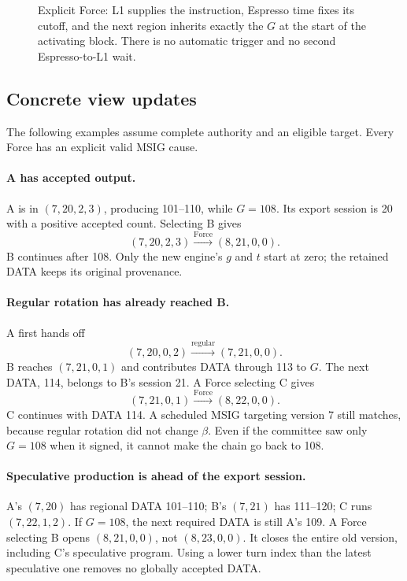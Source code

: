 \documentclass[11pt,a4paper]{article}
\begin{document}
\begin{figure}[p]\centering

\caption{Explicit Force: L1 supplies the instruction, Espresso time fixes
its cutoff, and the next region inherits exactly the $G$ at the start of
the activating block. There is no automatic trigger and no second
Espresso-to-L1 wait.}
\label{fig:forced-cross-region}
\end{figure}
\FloatBarrier

\subsection{Concrete view updates}
\label{sec:force-view-examples}
The following examples assume complete authority and an eligible target.
Every Force has an explicit valid MSIG cause.

\paragraph{A has accepted output.}
A is in $(7,20,2,3)$, producing 101--110, while $G=108$. Its export
session is 20 with a positive accepted count. Selecting B gives
\[
 (7,20,2,3)\xrightarrow{\mathrm{Force}}(8,21,0,0).
\]
B continues after 108. Only the new engine's $g$ and $t$ start at zero;
the retained DATA keeps its original provenance.

\paragraph{Regular rotation has already reached B.}
A first hands off
\[
 (7,20,0,2)\xrightarrow{\mathrm{regular}}(7,21,0,0).
\]
B reaches $(7,21,0,1)$ and contributes DATA through 113 to $G$. The next
DATA, 114, belongs to B's session 21. A Force selecting C gives
\[
 (7,21,0,1)\xrightarrow{\mathrm{Force}}(8,22,0,0).
\]
C continues with DATA 114. A scheduled MSIG targeting version 7 still
matches, because regular rotation did not change $\beta$. Even if the
committee saw only $G=108$ when it signed, it cannot make the chain go
back to 108.

\paragraph{Speculative production is ahead of the export session.}
A's $(7,20)$ has regional DATA 101--110; B's $(7,21)$ has 111--120; C runs
$(7,22,1,2)$. If $G=108$, the next required DATA is still A's 109. A Force
selecting B opens $(8,21,0,0)$, not $(8,23,0,0)$. It closes the entire old
version, including C's speculative program. Using a lower turn index than
the latest speculative one removes no globally accepted DATA.
\end{document}
